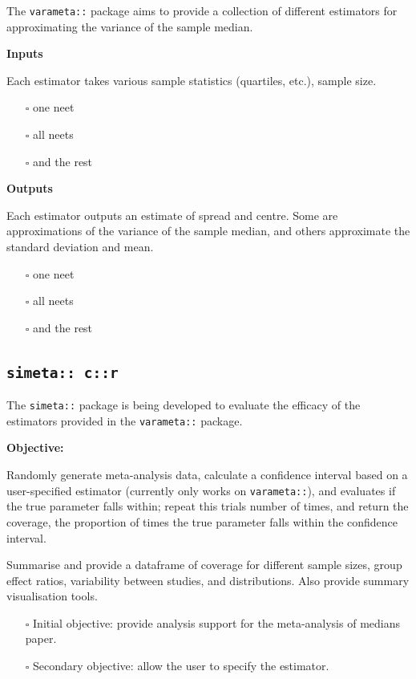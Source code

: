 \documentclass[
]{article}
\providecommand{\tightlist}{%
  \setlength{\itemsep}{0pt}\setlength{\parskip}{0pt}}
\begin{document}
The \texttt{varameta::} package aims to provide a collection of different estimators for approximating the variance of the sample median.

\textbf{Inputs}

Each estimator takes various sample statistics (quartiles, etc.), sample size.

\begin{itemize}
\tightlist
\item[$\square$]
  one neet
\item[$\square$]
  all neets
\item[$\square$]
  and the rest
\end{itemize}

\textbf{Outputs}

Each estimator outputs an estimate of spread and centre. Some are approximations of the variance of the sample median, and others approximate the standard deviation and mean.

\begin{itemize}
\tightlist
\item[$\square$]
  one neet
\item[$\square$]
  all neets
\item[$\square$]
  and the rest
\end{itemize}

\hypertarget{simeta-cr}{%
\subsection{\texorpdfstring{\texttt{simeta::\ c::r}}{simeta:: c::r}}\label{simeta-cr}}

The \texttt{simeta::} package is being developed to evaluate the efficacy of the estimators provided in the \texttt{varameta::} package.

\textbf{Objective:}

Randomly generate meta-analysis data, calculate a confidence interval based on a user-specified estimator (currently only works on \texttt{varameta::}), and evaluates if the true parameter falls within; repeat this \textbar trials\textbar{} number of times, and return the coverage, the proportion of times the true parameter falls within the confidence interval.

Summarise and provide a dataframe of coverage for different sample sizes, group effect ratios, variability between studies, and distributions. Also provide summary visualisation tools.

\begin{itemize}
\item[$\square$]
  Initial objective: provide analysis support for the meta-analysis of medians paper.
\item[$\square$]
  Secondary objective: allow the user to specify the estimator.
\end{itemize}
\end{document}
